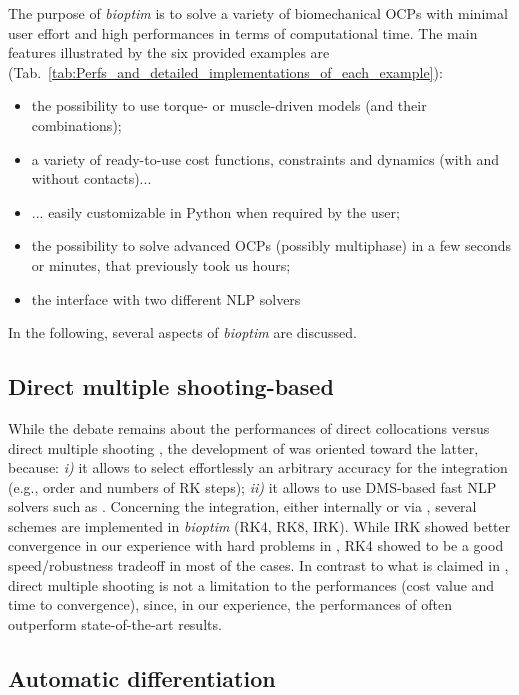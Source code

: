 The purpose of \textit{bioptim} is to solve a variety of biomechanical OCPs with minimal user effort and high performances in terms of computational time. 
The main features illustrated by the six provided examples are (Tab.~\ref{tab:Perfs_and_detailed_implementations_of_each_example}): 
\begin{itemize}
\item the possibility to use torque- or muscle-driven models (and their combinations);
\item a variety of ready-to-use cost functions, constraints and dynamics (with and without contacts)...
\item ... easily customizable in Python when required by the user;
\item the possibility to solve advanced OCPs (possibly multiphase) in a few seconds or minutes, that previously took us hours;
\item the interface with two different NLP solvers
\end{itemize}
In the following, several aspects of \textit{bioptim} are discussed.


\subsection{Direct multiple shooting-based}

While the debate remains about the performances of direct collocations versus direct multiple shooting \cite{diehl2006fast, porsa2016direct}, the development of \bioptim was oriented toward the latter, because: \textit{i)} it allows to select effortlessly an arbitrary accuracy for the integration (e.g., order and numbers of RK steps); \textit{ii)} it allows to use DMS-based fast NLP solvers such as \acados.
Concerning the integration, either internally or via \acados, several schemes are implemented in \textit{bioptim} (RK4, RK8, IRK).
While IRK showed better convergence in our experience with hard problems in \acados, RK4 showed to be a good speed/robustness tradeoff in most of the cases. 
In contrast to what is claimed in \cite{porsa2016direct}, direct multiple shooting is not a limitation to the performances (cost value and time to convergence), since, in our experience, the performances of \bioptim often outperform state-of-the-art results.

\subsection{Automatic differentiation}

